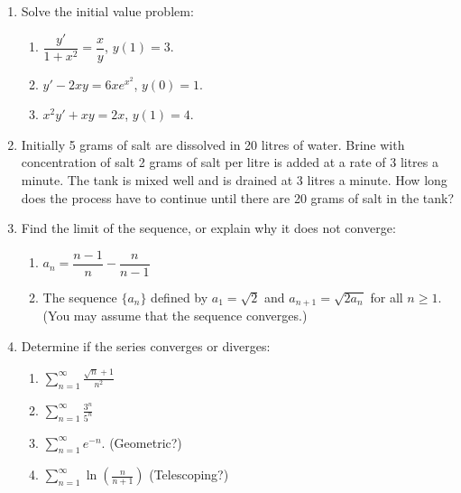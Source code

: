 \documentclass[12pt]{article}
\newcommand{\di}{\displaystyle}
\begin{document}
\newpage





 \begin{enumerate}
\item Solve the initial value problem:
\begin{enumerate}
\item $\dfrac{y'}{1+x^2}=\dfrac{x}{y}$, $y(1)=3$.

\vspace{2in}

\item $y'-2xy = 6xe^{x^2}$, $y(0)=1$.

\vspace{3in}

\item $x^2y'+xy=2x$, $y(1)=4$.
\end{enumerate}
 \newpage
 
\item Initially 5 grams of salt are dissolved in 20 litres of water.
Brine with concentration of salt 2 grams of salt per litre is
added at a rate of 3 litres a minute. The tank is mixed well
and is drained at 3 litres a minute. How long does the process have to continue until there are 20 grams of salt in the
tank?

\newpage

\item Find the limit of the sequence, or explain why it does not converge:\begin{enumerate}
 \item $a_n = \dfrac{n-1}{n}-\dfrac{n}{n-1}$

\vspace{1in}

 \item The sequence $\{a_n\}$ defined by $a_1 = \sqrt{2}$ and $a_{n+1} = \sqrt{2a_n}$ for all $n\geq 1$. (You may assume that the sequence converges.)
 
 \vspace{1in}
 
\end{enumerate}
\item Determine if the series converges or diverges:
\begin{multicols}{2}
\begin{enumerate}

 \item $\di \sum_{n=1}^\infty \frac{\sqrt{n}+1}{n^2}$

\vspace{1.5in}

 \item $\di \sum_{n=1}^\infty \frac{3^n}{5^n}$

\columnbreak

 \item $\di \sum_{n=1}^\infty e^{-n}$. (Geometric?)
 
 \vspace{1.5in}
 
 \item $\di \sum_{n=1}^\infty \ln\left(\frac{n}{n+1}\right)$ (Telescoping?)
\end{enumerate}
\end{multicols}
\end{enumerate}
\end{document}
